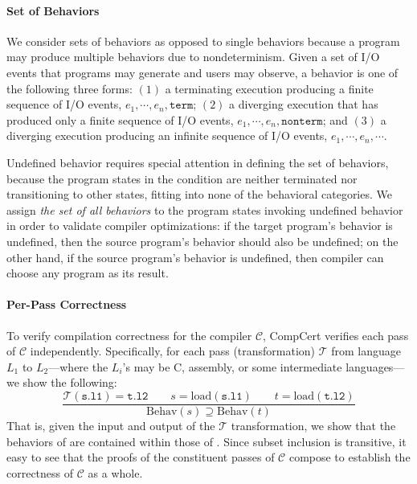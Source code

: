 \paragraph{Set of Behaviors}

We consider sets of behaviors as opposed to single behaviors because a program may produce multiple
behaviors due to nondeterminism.  Given a set of I/O events that programs may generate and users may
observe, a behavior is one of the following three forms: $(1)$ a terminating execution producing a
finite sequence of I/O events, $e_1, \cdots, e_n, \mathtt{term}$; $(2)$ a diverging execution that
has produced only a finite sequence of I/O events, $e_1, \cdots, e_n, \mathtt{nonterm}$; and $(3)$ a
diverging execution producing an infinite sequence of I/O events, $e_1, \cdots, e_n, \cdots$.

Undefined behavior requires special attention in defining the set of behaviors, because the program
states in the condition are neither terminated nor transitioning to other states, fitting into none
of the behavioral categories.  We assign \emph{the set of all behaviors} to the program states
invoking undefined behavior in order to validate compiler optimizations: if the target program's
behavior is undefined, then the source program's behavior should also be undefined; on the other
hand, if the source program's behavior is undefined, then compiler can choose any program as its
result.


\paragraph{Per-Pass Correctness}

To verify compilation correctness for the compiler $\mathcal{C}$, CompCert verifies each pass of
$\mathcal{C}$ independently.  Specifically, for each pass (transformation) $\mathcal{T}$ from
language $L_1$ to $L_2$---where the $L_i$'s may be C, assembly, or some intermediate languages---we
show the following:
\[
\frac{
\mathcal{T}(\mathtt{s.l1}) = \mathtt{t.l2} \qquad
s = \mathrm{load}(\mathtt{s.l1}) \qquad
t = \mathrm{load}(\mathtt{t.l2})
}
{
\mathrm{Behav}(s) \supseteq \mathrm{Behav}(t)
}
\]
That is, given the input  and output  of the $\mathcal{T}$ transformation, we
show that the behaviors of  are contained within those of .  Since subset
inclusion is transitive, it easy to see that the proofs of the constituent passes of $\mathcal{C}$
compose to establish the correctness of $\mathcal{C}$ as a whole.

